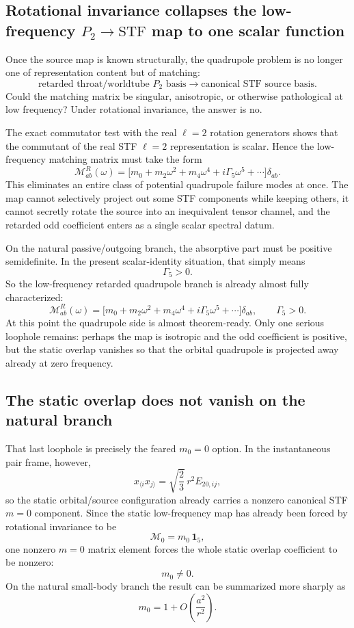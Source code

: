 \documentclass[11pt]{article}
\begin{document}
\subsection{Rotational invariance collapses the low-frequency \texorpdfstring{$P_2\to\mathrm{STF}$}{P\_2 -> STF} map to one scalar function}
\label{sec:quadrupole-surviving-matching}

Once the source map is known structurally, the quadrupole problem is no longer
one of representation content but of matching:
\[
\text{retarded throat/worldtube }P_2\text{ basis}
\longrightarrow
\text{canonical STF source basis}.
\]
Could the matching matrix be singular, anisotropic, or otherwise pathological at
low frequency?  Under rotational invariance, the answer is no.

The exact commutator test with the real $\ell=2$ rotation generators shows that
the commutant of the real STF $\ell=2$ representation is scalar.  Hence the
low-frequency matching matrix must take the form
\[
\mathcal M_{ab}^R(\omega)
=
\bigl[m_0+m_2\omega^2+m_4\omega^4+i\Gamma_5\omega^5+\cdots\bigr]\delta_{ab}.
\]
This eliminates an entire class of potential quadrupole failure modes at once.
The map cannot selectively project out some STF components while keeping others,
it cannot secretly rotate the source into an inequivalent tensor channel, and the
retarded odd coefficient enters as a single scalar spectral datum.

On the natural passive/outgoing branch, the absorptive part must be positive
semidefinite.  In the present scalar-identity situation, that simply means
\[
\Gamma_5>0.
\]
So the low-frequency retarded quadrupole branch is already almost fully
characterized:
\[
\boxed{
\mathcal M_{ab}^R(\omega)
=
\bigl[m_0+m_2\omega^2+m_4\omega^4+i\Gamma_5\omega^5+\cdots\bigr]\delta_{ab},
\qquad
\Gamma_5>0.
}
\]
At this point the quadrupole side is almost theorem-ready.  Only one serious
loophole remains: perhaps the map is isotropic and the odd coefficient is
positive, but the static overlap vanishes so that the orbital quadrupole is
projected away already at zero frequency.

\subsection{The static overlap does not vanish on the natural branch}
\label{sec:quadrupole-surviving-static-overlap}

That last loophole is precisely the feared $m_0=0$ option.  In the instantaneous
pair frame, however,
\[
x_{\langle i}x_{j\rangle}=\sqrt{\frac23}\,r^2E_{20,ij},
\]
so the static orbital/source configuration already carries a nonzero canonical
STF $m=0$ component.  Since the static low-frequency map has already been forced
by rotational invariance to be
\[
\mathcal M_0=m_0\,\mathbf 1_5,
\]
one nonzero $m=0$ matrix element forces the whole static overlap coefficient to
be nonzero:
\[
\boxed{m_0\neq0.}
\]
On the natural small-body branch the result can be summarized more sharply as
\[
\boxed{m_0=1+O\!\left(\frac{a^2}{r^2}\right).}
\]
\end{document}
